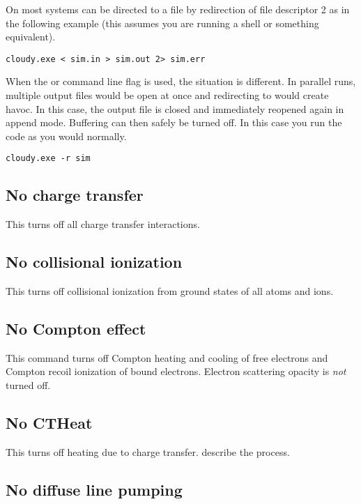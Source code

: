 On most systems  can be directed to a file by redirection of file descriptor 2 as in the following example
(this assumes you are running a  shell or something equivalent).
\begin{verbatim}
cloudy.exe < sim.in > sim.out 2> sim.err
\end{verbatim}
When the  or  command line flag is used, the
situation is different. In parallel runs, multiple output files would be open
at once and redirecting to  would create havoc. In this
case, the output file is closed and immediately reopened again in append mode.
Buffering can then safely be turned off. In this case you run the code as you
would normally.
\begin{verbatim}
cloudy.exe -r sim
\end{verbatim}

\subsection{No charge transfer}

This turns off all charge transfer interactions.

\subsection{No collisional ionization}

This turns off collisional ionization from ground states of all atoms
and ions.

\subsection{No Compton effect}

This command turns off Compton heating and cooling of free electrons
and Compton recoil ionization of bound electrons.
Electron scattering opacity is \emph{not} turned off.

\subsection{No CTHeat}

This turns off heating due to charge transfer.
\citet{KingdonFerland1999} describe the process.

\subsection{No diffuse line pumping}

